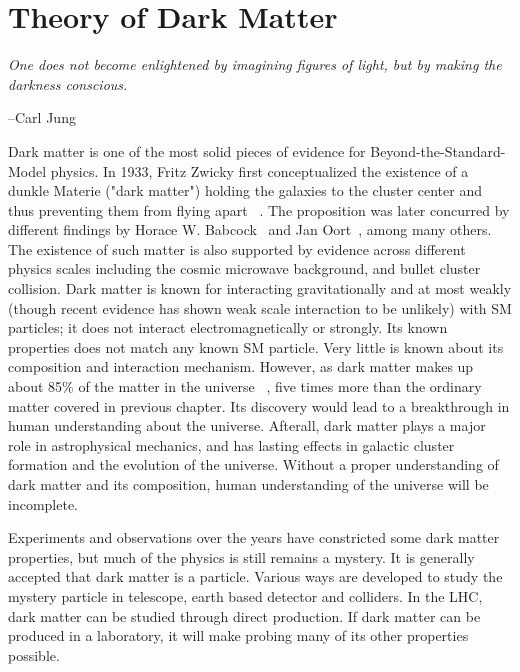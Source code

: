 \chapter{Theory of Dark Matter}
\label{chapter:DM}


\epigraph{\textit{One does not become enlightened by imagining figures of light, but by making the darkness conscious.}}{--Carl Jung}

    Dark matter is one of the most solid pieces of evidence for Beyond-the-Standard-Model physics. In 1933, Fritz Zwicky first conceptualized the existence of a dunkle Materie ("dark matter") holding the galaxies to the cluster center and thus preventing them from flying apart ~\cite{Zwicky}. The proposition was later concurred by different findings by Horace W. Babcock~\cite{Babcock} and Jan Oort~\cite{oort}, among many others. The existence of such matter is also supported by evidence across different physics scales including the cosmic microwave background, and bullet cluster collision.  
    Dark matter is known for interacting gravitationally and at most weakly (though recent evidence has shown weak scale interaction to be unlikely) with SM particles; it does not interact electromagnetically or strongly. Its known properties does not match any known SM particle. Very little is known about its composition and interaction mechanism. However, as dark matter makes up about 85\% of the matter in the universe ~\cite{Hinshaw_2013}, five times more than the ordinary matter covered in previous chapter. Its discovery would lead to a breakthrough in human understanding about the universe. Afterall, dark matter plays a major role in astrophysical mechanics, and has lasting effects in galactic cluster formation and the evolution of the universe. Without a proper understanding of dark matter and its composition, human understanding of the universe will be incomplete.

    Experiments and observations over the years have constricted some dark matter properties, but much of the physics is still remains a mystery. It is generally accepted that dark matter is a particle. Various ways are developed to study the mystery particle in telescope, earth based detector and colliders. In the LHC, dark matter can be studied through direct production. If dark matter can be produced in a laboratory, it will make probing many of its other properties possible. 

